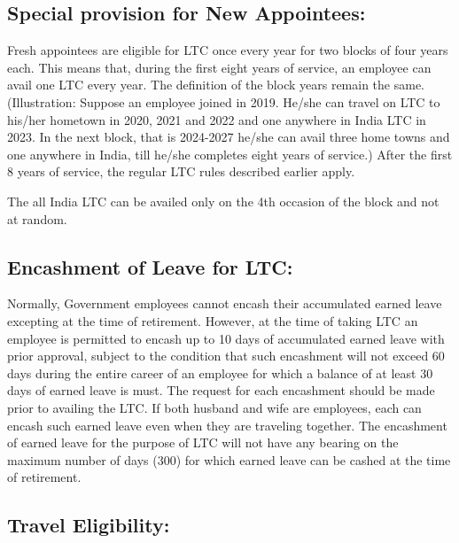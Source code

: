 \documentclass[
  10pt,
  a5paper,
  10pt,
  openany]{amsbook}
\begin{document}
\subsection{Special provision for New
Appointees:}\label{special-provision-for-new-appointees}

Fresh appointees are eligible for LTC once every year for two blocks of
four years each. This means that, during the first eight years of
service, an employee can avail one LTC every year. The definition of the
block years remain the same. (Illustration: Suppose an employee joined
in 2019. He/she can travel on LTC to his/her hometown in 2020, 2021 and
2022 and one anywhere in India LTC in 2023. In the next block, that is
2024-2027 he/she can avail three home towns and one anywhere in India,
till he/she completes eight years of service.) After the first 8 years
of service, the regular LTC rules described earlier apply.

The all India LTC can be availed only on the 4th occasion of the block
and not at random.

\subsection{Encashment of Leave for
LTC:}\label{encashment-of-leave-for-ltc}

Normally, Government employees cannot encash their accumulated earned
leave excepting at the time of retirement. However, at the time of
taking LTC an employee is permitted to encash up to 10 days of
accumulated earned leave with prior approval, subject to the condition
that such encashment will not exceed 60 days during the entire career of
an employee for which a balance of at least 30 days of earned leave is
must. The request for each encashment should be made prior to availing
the LTC. If both husband and wife are employees, each can encash such
earned leave even when they are traveling together. The encashment of
earned leave for the purpose of LTC will not have any bearing on the
maximum number of days (300) for which earned leave can be cashed at the
time of retirement.

\subsection{Travel Eligibility:}\label{travel-eligibility}
\end{document}
